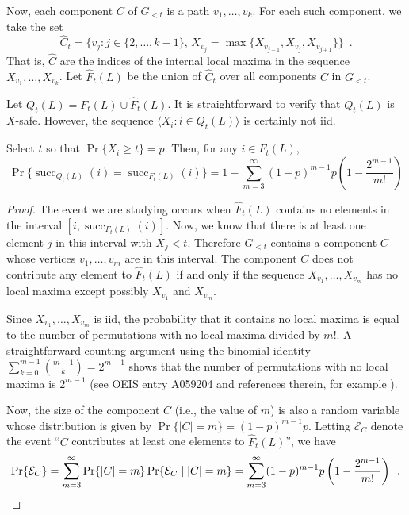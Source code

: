 \documentclass{patmorin}
\DeclareMathOperator{\cw}{succ}
\begin{document}
Now, each component $C$ of $G_{<t}$ is a path $v_1,\ldots,v_k$.  For each
such component, we take the set 
\[ 
    \hat{C}_t=\{v_j : j\in\{2,\ldots,k-1\},\, X_{v_j}=\max\{X_{v_{j-1}},X_{v_j},X_{v_{j+1}}\}\} \enspace .
\]
That is, $\hat{C}$ are the indices of the internal local maxima in the
sequence $X_{v_1},\ldots,X_{v_k}$.  Let $\hat{F}_t(L)$ be the union of
$\hat{C}_t$ over all components $C$ in $G_{<t}$.

Let $Q_t(L)= F_t(L)\cup \hat{F}_t(L)$. It is straightforward to verify
that $Q_t(L)$ is $X$-safe.  However, the sequence $\langle X_i: i\in
Q_t(L)\rangle$ is certainly not iid.  

\begin{lem}
  Select $t$ so that $\Pr\{X_i\ge t\}=p$.  Then,
  for any $i\in F_t(L)$, 
  \[
    \Pr\{\cw_{Q_t(L)}(i) = \cw_{F_t(L)}(i)\} =  
      1-\sum_{m=3}^\infty (1-p)^{m-1}p\left(1-\frac{2^{m-1}}{m!}\right)
  \]
\end{lem}

\begin{proof}
   The event we are studying occurs when $\hat{F}_t(L)$ contains
   no elements in the interval $[i,\cw_{F_t(L)}(i)]$.  Now, we know
   that there is at least one element $j$ in this interval with $X_j
   < t$.  Therefore $G_{<t}$ contains a component $C$ whose vertices
   $v_1,\ldots,v_m$ are in this interval. The component $C$ does not
   contribute any element to $\hat{F}_t(L)$ if and only if the sequence
   $X_{v_1},\ldots,X_{v_m}$ has no local maxima except possibly $X_{v_1}$
   and $X_{v_m}$. 

   Since $X_{v_1},\ldots,X_{v_m}$ is iid, the probability that it contains
   no local maxima is equal to the number of permutations with no local
   maxima divided by $m!$.  A straightforward counting argument using
   the binomial identity $\sum_{k=0}^{m-1}\binom{m-1}{k}=2^{m-1}$ shows
   that the number of permutations with no local maxima is $2^{m-1}$
   (see OEIS entry A059204 and references therein, for example \cite{X}).

   Now, the size of the component $C$ (i.e., the value of $m$)
   is also a random variable whose distribution is given by
   $\Pr\{|C|=m\}=(1-p)^{m-1}p$.  Letting $\mathcal{E}_C$ denote the event ``$C$  contributes at least one elements to $\hat{F}_t(L)$'', we have
   \[
       \Pr\{\mathcal{E}_C\} = \sum_{m=3}^\infty \Pr\{|C|=m\}\Pr\{\mathcal{E}_C\mid |C|=m\} = \sum_{m=3}^\infty (1-p)^{m-1}p\left(1-\frac{2^{m-1}}{m!}\right) \enspace . \qedhere
   \]
\end{proof}
\end{document}
